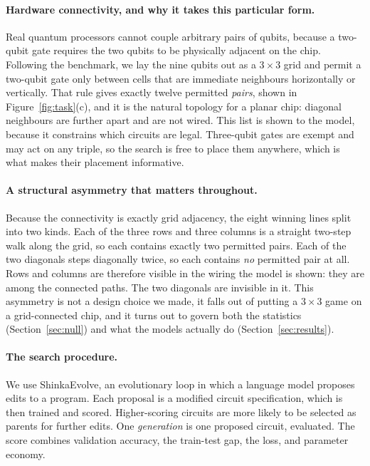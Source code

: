 \documentclass[11pt]{article}
\begin{document}
\paragraph{Hardware connectivity, and why it takes this particular form.}
Real quantum processors cannot couple arbitrary pairs of qubits, because a
two-qubit gate requires the two qubits to be physically adjacent on the chip.
Following the benchmark, we lay the nine qubits out as a $3\times3$ grid and
permit a two-qubit gate only between cells that are immediate neighbours
horizontally or vertically. That rule gives exactly twelve permitted
\emph{pairs}, shown in Figure~\ref{fig:task}(c), and it is the natural topology
for a planar chip: diagonal neighbours are further apart and are not wired.
This list is shown to the model, because it constrains which circuits are legal.
Three-qubit gates are exempt and may act on any triple, so the search is free to
place them anywhere, which is what makes their placement informative.

\paragraph{A structural asymmetry that matters throughout.}
Because the connectivity is exactly grid adjacency, the eight winning lines split
into two kinds. Each of the three rows and three columns is a straight two-step
walk along the grid, so each contains exactly two permitted pairs. Each of the two
diagonals steps diagonally twice, so each contains \emph{no} permitted pair at
all. Rows and columns are therefore visible in the wiring the model is shown:
they are among the connected paths. The two diagonals are invisible in it.
This asymmetry is not a design choice we made, it falls out of putting a
$3\times3$ game on a grid-connected chip, and it turns out to govern both the
statistics (Section~\ref{sec:null}) and what the models actually do
(Section~\ref{sec:results}).

\paragraph{The search procedure.}
We use ShinkaEvolve, an evolutionary loop in which a language model proposes
edits to a program. Each proposal is a modified circuit specification, which is
then trained and scored. Higher-scoring circuits are more likely to be selected
as parents for further edits. One \emph{generation} is one proposed circuit,
evaluated. The score combines validation accuracy, the train-test gap, the loss,
and parameter economy.
\end{document}
